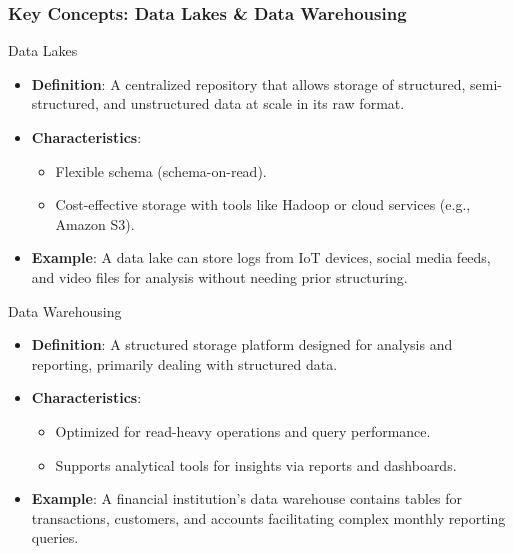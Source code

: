 \documentclass[aspectratio=169]{beamer}
\begin{document}
\begin{frame}[fragile]
    \frametitle{Key Concepts: Data Lakes & Data Warehousing}
    \begin{block}{Data Lakes}
        \begin{itemize}
            \item \textbf{Definition}: A centralized repository that allows storage of structured, semi-structured, and unstructured data at scale in its raw format.
            \item \textbf{Characteristics}:
            \begin{itemize}
                \item Flexible schema (schema-on-read).
                \item Cost-effective storage with tools like Hadoop or cloud services (e.g., Amazon S3).
            \end{itemize}
            \item \textbf{Example}: A data lake can store logs from IoT devices, social media feeds, and video files for analysis without needing prior structuring.
        \end{itemize}
    \end{block}

    \begin{block}{Data Warehousing}
        \begin{itemize}
            \item \textbf{Definition}: A structured storage platform designed for analysis and reporting, primarily dealing with structured data.
            \item \textbf{Characteristics}:
            \begin{itemize}
                \item Optimized for read-heavy operations and query performance.
                \item Supports analytical tools for insights via reports and dashboards.
            \end{itemize}
            \item \textbf{Example}: A financial institution's data warehouse contains tables for transactions, customers, and accounts facilitating complex monthly reporting queries.
        \end{itemize}
    \end{block}
\end{frame}
\end{document}
